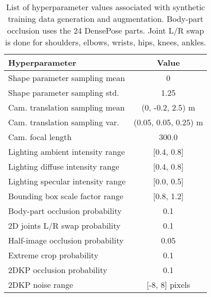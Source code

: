 \begin{table}[t]
\centering
\small
\begin{tabular}{l c}
    \hline
    \textbf{Hyperparameter} & \textbf{Value}\\
    \hline
    Shape parameter sampling mean & 0 \\
    Shape parameter sampling std. & 1.25 \\
    Cam. translation sampling mean & (0, -0.2, 2.5) m\\
    Cam. translation sampling var. & (0.05, 0.05, 0.25) m\\
    Cam. focal length & 300.0\\
    Lighting ambient intensity range & [0.4, 0.8]\\
    Lighting diffuse intensity range & [0.4, 0.8]\\
    Lighting specular intensity range & [0.0, 0.5]\\
    Bounding box scale factor range & [0.8, 1.2]\\
    \hline
    Body-part occlusion probability & 0.1 \\
    2D joints L/R swap probability & 0.1\\
    Half-image occlusion probability & 0.05\\
    Extreme crop probability & 0.1\\
    2DKP occlusion probability & 0.1\\
    2DKP noise range & [-8, 8] pixels\\
    \hline
    \end{tabular}
\caption{List of hyperparameter values associated with synthetic training data generation and augmentation. Body-part occlusion uses the 24 DensePose \cite{Guler2018DensePose} parts. Joint L/R swap is done for shoulders, elbows, wrists, hips, knees, ankles.}
\vspace{-0.7cm}
\label{tab:supmat_synthetic_data}
\end{table}

